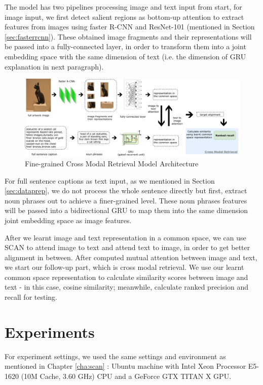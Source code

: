 The model has two pipelines processing image and text input from start, for image input, we first detect salient regions as bottom-up attention \cite{bottomup} to extract features from images using faster R-CNN \cite{fasterrcnn} and ResNet-101 \cite{resnet} (mentioned in Section \ref{sec:fasterrcnn}). These obtained image fragments and their representations will be passed into a fully-connected layer, in order to transform them into a joint embedding space with the same dimension of text (i.e. the dimension of GRU explanation in next paragraph).

\begin{figure}[h!]
\centering
\includegraphics[width=1.0\textwidth]{archinew.pdf}
\caption{Fine-grained Cross Modal Retrieval Model Architecture}
\label{fig:mainarch}
\end{figure}

For full sentence captions as text input, as we mentioned in Section \ref{sec:dataprep}, we do not process the whole sentence directly but first, extract noun phrases out to achieve a finer-grained level. These noun phrases features will be passed into a bidirectional GRU to map them into the same dimension joint embedding space as image features. 

After we learnt image and text representation in a common space, we can use SCAN to attend image to text and attend text to image, in order to get better alignment in between. After computed mutual attention between image and text, we start our follow-up part, which is cross modal retrieval. We use our learnt common space representation to calculate similarity scores between image and text - in this case, cosine similarity; meanwhile, calculate ranked precision and recall for testing.

\section{Experiments}

For experiment settings, we used the same settings and environment as mentioned in Chapter \ref{cha:scan} : Ubuntu machine with Intel Xeon Processor E5-1620 (10M Cache, 3.60 GHz) CPU and a GeForce GTX TITAN X GPU. 

